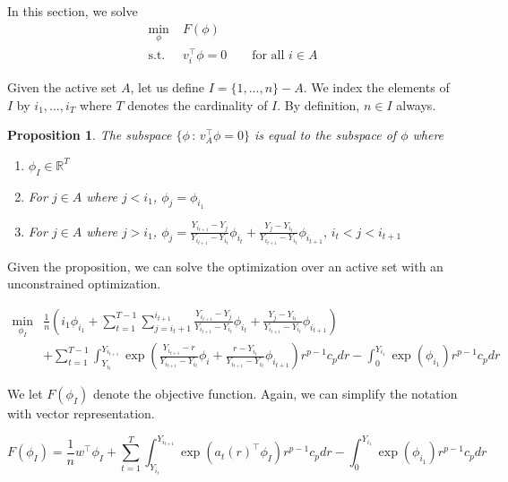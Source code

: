 \documentclass[12pt]{article}
\newtheorem{proposition}[theorem]{Proposition}
\begin{document}
In this section, we solve
\begin{align*}
\min_{\phi} \;& F(\phi)  \\
 \text{s.t.} \;& v_i^\top \phi = 0 \qquad \text{for all $i \in A$}
\end{align*}

Given the active set $A$, let us define $I = \{1,...,n\} - A$. We index the elements of $I$ by $i_1, ..., i_T$ where $T$ denotes the cardinality of $I$. By definition, $n \in I$ always. 

\begin{proposition}
The subspace $\{ \phi \,:\, v_A^\top \phi = 0 \}$ is equal to the subspace of $\phi$ where 
\begin{enumerate}
\item $ \phi_I \in \mathbb{R}^T$
\item For $j \in A$ where $j < i_1$, $\phi_j = \phi_{i_1}$
\item For $j \in A$ where $j > i_1$, $\phi_j = 
        \frac{Y_{i_{t+1}} - Y_j}{Y_{i_{t+1}} - Y_{i_t}} \phi_{i_t} +
         \frac{Y_j - Y_{i_t}}{Y_{i_{t+1}} - Y_{i_t}} \phi_{i_{t+1}} ,\, i_t < j < i_{t+1} $
\end{enumerate}

\end{proposition}

Given the proposition, we can solve the optimization over an active set with an unconstrained optimization. 

\begin{align*}
\min_{\phi_I} & \frac{1}{n} \left( i_1 \phi_{i_1} + 
          \sum_{t=1}^{T-1} \sum_{j=i_t + 1}^{i_{t+1}}   
         \frac{Y_{i_{t+1}} - Y_j}{Y_{i_{t+1}} - Y_{i_t}} \phi_{i_t} +
         \frac{Y_j - Y_{i_t}}{Y_{i_{t+1}} - Y_{i_t}} \phi_{i_{t+1}} \right) \\
     &  + 
       \sum_{t=1}^{T-1} \int_{Y_{i_t}}^{Y_{i_{t+1}}} \exp
       \left( \frac{Y_{i_{t+1}} -r}{Y_{i_{t+1}} -Y_{i_t}} \phi_i + \frac{r -Y_{i_t}}{Y_{i_{t+1}} -Y_{i_t}} \phi_{i_{t+1}}\right)
         r^{p-1} c_p dr - 
   \int_0^{Y_{i_1}} \exp(\phi_{i_1}) r^{p-1} c_p dr 
\end{align*}

We let $F(\phi_I)$ denote the objective function. Again, we can simplify the notation with vector representation.

\[
F(\phi_I) = \frac{1}{n} w^\top \phi_I + 
    \sum_{t=1}^T \int_{Y_{i_t}}^{Y_{i_{t+1}}} \exp(a_t(r)^\top \phi_I) r^{p-1} c_p dr - 
    \int_0^{Y_{i_1}} \exp(\phi_{i_1}) r^{p-1} c_p dr
\]
 
\end{document}
